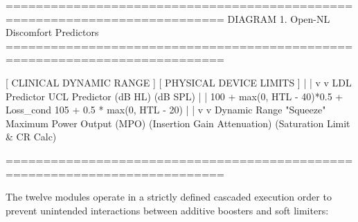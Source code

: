 \documentclass[
]{article}
\newenvironment{Shaded}{}{}
\newcommand{\NormalTok}[1]{#1}
\begin{document}
\begin{Shaded}
\begin{Highlighting}[]
\NormalTok{===========================================================================}
\NormalTok{                  DIAGRAM 1. Open{-}NL Discomfort Predictors}
\NormalTok{===========================================================================}

\NormalTok{       [ CLINICAL DYNAMIC RANGE ]          [ PHYSICAL DEVICE LIMITS ]}
\NormalTok{                   |                                   |}
\NormalTok{                   v                                   v}
\NormalTok{             LDL Predictor                       UCL Predictor}
\NormalTok{                (dB HL)                            (dB SPL)}
\NormalTok{                   |                                   |}
\NormalTok{    100 + max(0, HTL {-} 40)*0.5 + Loss\_cond    105 + 0.5 * max(0, HTL {-} 20)}
\NormalTok{                   |                                   |}
\NormalTok{                   v                                   v}
\NormalTok{        Dynamic Range "Squeeze"            Maximum Power Output (MPO) }
\NormalTok{      (Insertion Gain Attenuation)       (Saturation Limit \& CR Calc)}

\NormalTok{===========================================================================}
\end{Highlighting}
\end{Shaded}

The twelve modules operate in a strictly defined cascaded execution
order to prevent unintended interactions between additive boosters and
soft limiters:
\end{document}
